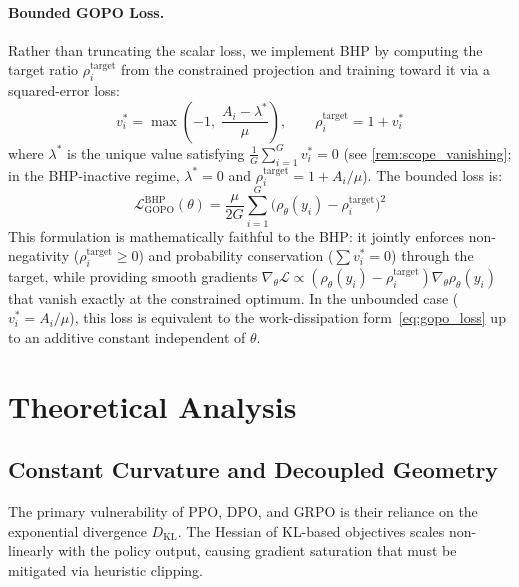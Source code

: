 \documentclass[11pt]{article}
\theoremstyle{definition}
\theoremstyle{remark}
\newcommand{\KL}{\mathrm{KL}}
\newcommand{\loss}{\mathcal{L}}
\begin{document}
\paragraph{Bounded GOPO Loss.}
Rather than truncating the scalar loss, we implement BHP by computing the target ratio $\rho_i^{\text{target}}$ from the constrained projection and training toward it via a squared-error loss:
\begin{equation}
\label{eq:bhp_target}
    v_i^* = \max\!\left(-1, \; \frac{A_i - \lambda^*}{\mu}\right), \qquad \rho_i^{\text{target}} = 1 + v_i^*
\end{equation}
where $\lambda^*$ is the unique value satisfying $\frac{1}{G}\sum_{i=1}^G v_i^* = 0$ (see \cref{rem:scope_vanishing}; in the BHP-inactive regime, $\lambda^* = 0$ and $\rho_i^{\text{target}} = 1 + A_i/\mu$). The bounded loss is:
\begin{equation}
\label{eq:gopo_bounded}
    \loss_{\text{GOPO}}^{\text{BHP}}(\theta) = \frac{\mu}{2G}\sum_{i=1}^G \big(\rho_\theta(y_i) - \rho_i^{\text{target}}\big)^2
\end{equation}
This formulation is mathematically faithful to the BHP: it jointly enforces non-negativity ($\rho_i^{\text{target}} \geq 0$) and probability conservation ($\sum v_i^* = 0$) through the target, while providing smooth gradients $\nabla_\theta \loss \propto (\rho_\theta(y_i) - \rho_i^{\text{target}})\nabla_\theta \rho_\theta(y_i)$ that vanish exactly at the constrained optimum. In the unbounded case ($v_i^* = A_i/\mu$), this loss is equivalent to the work-dissipation form~\eqref{eq:gopo_loss} up to an additive constant independent of $\theta$.

\section{Theoretical Analysis}
\label{sec:analysis}

\subsection{Constant Curvature and Decoupled Geometry}
\label{subsec:curvature}

The primary vulnerability of PPO, DPO, and GRPO is their reliance on the exponential divergence $D_{\KL}$. The Hessian of KL-based objectives scales non-linearly with the policy output, causing gradient saturation that must be mitigated via heuristic clipping.
\end{document}
